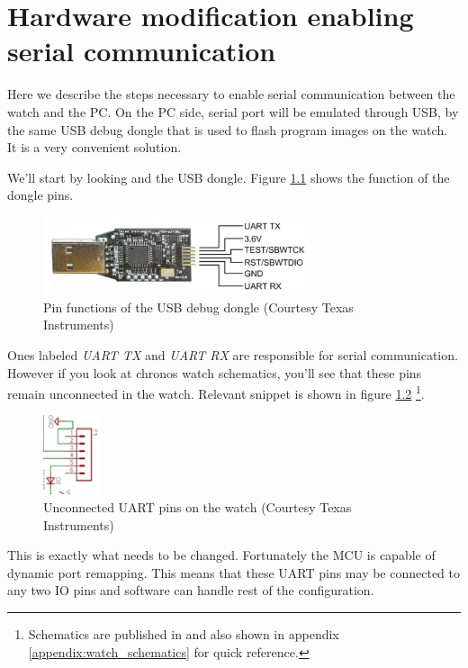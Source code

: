 \appendix
\chapter{Hardware modification enabling serial communication}
\label{appendix:uart_pins}

Here we describe the steps necessary to enable serial communication
between the watch and the PC. On the PC side, serial port will be
emulated through USB, by the same USB debug dongle that is used to
flash program images on the watch. It is a very convenient solution.

We'll start by looking and the USB dongle. Figure
\ref{fig:chronos_dongle_pins} shows the function of the dongle pins.
\begin{figure}[h]
  \centering
  \includegraphics[width=0.7\textwidth]{img/chronos_dongle_pins.png}
  \caption{Pin functions of the USB debug dongle (Courtesy Texas Instruments)}
  \label{fig:chronos_dongle_pins}
\end{figure}
Ones labeled \emph{UART TX} and \emph{UART RX} are responsible for
serial communication. However if you look at chronos watch schematics,
you'll see that these pins remain unconnected in the watch. Relevant
snippet is shown in figure \ref{fig:chronos_unonnected_uart}
\footnote{Schematics are published in \cite{eZ430Chronos} and also
shown in appendix \ref{appendix:watch_schematics} for quick
reference.}.
\begin{figure}[h]
  \centering
  \includegraphics[width=0.15\textwidth]{img/chronos_unonnected_uart.png}
  \caption{Unconnected UART pins on the watch (Courtesy Texas Instruments)}
  \label{fig:chronos_unonnected_uart}
\end{figure}
This is exactly what needs to be changed. Fortunately the MCU is
capable of dynamic port remapping. This means that these UART pins may
be connected to any two IO pins and software can handle rest of the
configuration.

